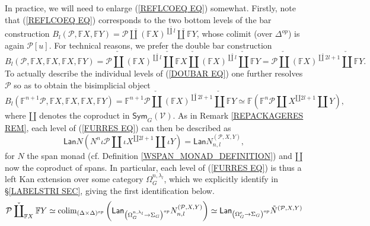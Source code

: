 \documentclass[a4paper,10pt]{article}%
\begin{document}
In practice, we will need to enlarge 
(\ref{REFLCOEQ EQ}) somewhat.
Firstly, note that (\ref{REFLCOEQ EQ})
corresponds to the two bottom levels of the bar construction
$B_l(\mathcal{P}, \mathbb{F} X, \mathbb{F} Y)=
\mathcal{P} \mathbin{\check{\amalg}}
(\mathbb{F} X)^{\check{\amalg} l} 
\mathbin{\check{\amalg}} \mathbb{F} Y$,
whose colimit (over $\Delta^{op}$) is again $\mathcal{P}[u]$.
For technical reasons, we prefer the double bar construction
\begin{equation}\label{DOUBAR EQ}
	B_l(\mathcal{P}, \mathbb{F} X, \mathbb{F} X, \mathbb{F} X, \mathbb{F} Y)
=
	\mathcal{P} \mathbin{\check{\amalg}}
	(\mathbb{F} X)^{\check{\amalg} l} 
	\mathbin{\check{\amalg}}
	\mathbb{F} X
	\mathbin{\check{\amalg}}
	(\mathbb{F} X)^{\check{\amalg} l} 
	\mathbin{\check{\amalg}} \mathbb{F} Y
=
	\mathcal{P} \mathbin{\check{\amalg}}
	(\mathbb{F} X)^{\check{\amalg} 2l+1} 
	\mathbin{\check{\amalg}} \mathbb{F} Y.
\end{equation}
To actually describe the individual levels  of
(\ref{DOUBAR EQ}) one further resolves $\mathcal{P}$
so as to obtain the bisimplicial object
\begin{equation}\label{FURRES EQ}
	B_l(\mathbb{F}^{n+1}\mathcal{P}, \mathbb{F} X, \mathbb{F} X, \mathbb{F} X, \mathbb{F} Y)
=
	\mathbb{F}^{n+1}\mathcal{P} \mathbin{\check{\amalg}}
	(\mathbb{F} X)^{\check{\amalg} 2l+1} 
	\mathbin{\check{\amalg}} \mathbb{F} Y
\simeq
	\mathbb{F}\left(
		\mathbb{F}^{n} \mathcal{P} \amalg
		X^{\amalg 2l+1} \amalg Y
	\right),
\end{equation}
where $\amalg$ denotes the coproduct in $\mathsf{Sym}_G(\mathcal{V})$.
As in Remark \ref{REPACKAGERES REM}, each level of 
(\ref{FURRES EQ})
can then be described as 
\begin{equation}\label{LANLEVELFOR EQ}
 \mathsf{Lan} N (N^{n} \iota \mathcal{P} 
\amalg \iota X^{\amalg 2l+1} \amalg \iota Y)
=
\mathsf{Lan} N^{(\mathcal P, X, Y)}_{n,l},
\end{equation}
for $N$ the span monad (cf. Definition \ref{WSPAN_MONAD_DEFINITION}) and $\amalg$ now the coproduct of spans.
In particular, each level of 
(\ref{FURRES EQ})
is thus a left Kan extension over some category
$\Omega_G^{n,\lambda_l}$, which we explicitly identify in 
\S \ref{LABELSTRI SEC}, giving the first identification below.
\begin{equation}\label{EXTTREEFOR EQ}
	\mathcal{P} \mathbin{\check{\coprod}}_{\mathbb{F} X} \mathbb{F} Y 
\simeq 
	\operatorname{colim}_{(\Delta \times \Delta)^{op}}
	\left(
	\mathsf{Lan}_{\left( \Omega_{G}^{n,\lambda_l} \to \Sigma_G \right)^{op}}
	N_{n,l}^{(\mathcal{P},X,Y)}
	\right)
\simeq 
	\mathsf{Lan}_{\left( \Omega_{G}^{e} \to \Sigma_G \right)^{op}}
	\tilde{N}^{(\mathcal{P},X,Y)}
\end{equation}
\end{document}
